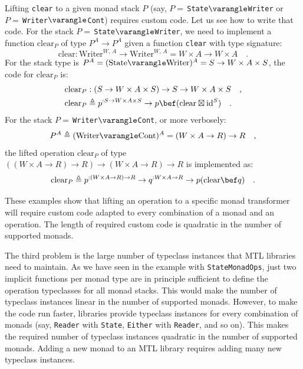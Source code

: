 Lifting \lstinline!clear! to a given monad stack $P$ (say, $P=\,$\lstinline!State!$\varangle$\lstinline!Writer!
or $P=\,$\lstinline!Writer!$\varangle$\lstinline!Cont!) requires
custom code. Let us see how to write that code. For the stack $P=\,$\lstinline!State!$\varangle$\lstinline!Writer!,
we need to implement a function $\text{clear}_{P}$ of type $P^{A}\rightarrow P^{A}$
given a function \lstinline!clear! with type signature:
\[
\text{clear}:\text{Writer}^{W,\,A}\rightarrow\text{Writer}^{W,\,A}=W\times A\rightarrow W\times A\quad.
\]
For the stack type is $P^{A}=(\text{State}\varangle\text{Writer})^{A}=S\rightarrow W\times A\times S$,
the code for $\text{clear}_{P}$ is:
\begin{align*}
 & \text{clear}_{P}:\left(S\rightarrow W\times A\times S\right)\rightarrow S\rightarrow W\times A\times S\quad,\\
 & \text{clear}_{P}\triangleq p^{:S\rightarrow W\times A\times S}\rightarrow p\bef(\text{clear}\boxtimes\text{id}^{S})\quad.
\end{align*}
For the stack $P=\,$\lstinline!Writer!$\varangle$\lstinline!Cont!,
or more verbosely:
\[
P^{A}\triangleq(\text{Writer}\varangle\text{Cont})^{A}=(W\times A\rightarrow R)\rightarrow R\quad,
\]
the lifted operation $\text{clear}_{P}$ of type $\left((W\times A\rightarrow R)\rightarrow R\right)\rightarrow(W\times A\rightarrow R)\rightarrow R$
is implemented as:
\[
\text{clear}_{P}\triangleq p^{:(W\times A\rightarrow R)\rightarrow R}\rightarrow q^{:W\times A\rightarrow R}\rightarrow p(\text{clear}\bef q)\quad.
\]

These examples show that lifting an operation to a specific monad
transformer will require custom code adapted to every combination
of a monad and an operation. The length of required custom code is
quadratic in the number of supported monads.

The third problem is the large number of typeclass instances that
MTL libraries need to maintain. As we have seen in the example with
\lstinline!StateMonadOps!, just two implicit functions per monad
type are in principle sufficient to define the operation typeclasses
for all monad stacks. This would make the number of typeclass instances
linear in the number of supported monads. However, to make the code
run faster, libraries provide typeclass instances for every combination
of monads (say, \lstinline!Reader! with \lstinline!State!, \lstinline!Either!
with \lstinline!Reader!, and so on). This makes the required number
of typeclass instances quadratic in the number of supported monads.
Adding a new monad to an MTL library requires adding many new typeclass
instances.

